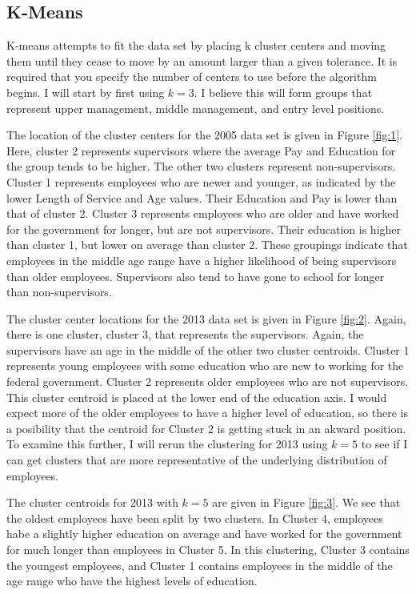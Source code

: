 \documentclass{article}
\begin{document}
    \subsection{K-Means}
    K-means attempts to fit the data set by placing k cluster centers and moving them until they cease to move by an amount larger than a given tolerance. It is required that you specify the number of centers to use before the algorithm begins. I will start by first using $k = 3$. I believe this will form groups that represent upper management, middle management, and entry level positions.
    \par
    The location of the cluster centers for the 2005 data set is given in Figure \ref{fig:1}. Here, cluster 2 represents supervisors where the average Pay and Education for the group tends to be higher. The other two clusters represent non-supervisors. Cluster 1 represents employees who are newer and younger, as indicated by the lower Length of Service and Age values. Their Education and Pay is lower than that of cluster 2. Cluster 3 represents employees who are older and have worked for the government for longer, but are not supervisors. Their education is higher than cluster 1, but lower on average than cluster 2. These groupings indicate that employees in the middle age range have a higher likelihood of being supervisors than older employees. Supervisors also tend to have gone to school for longer than non-supervisors.
    \par
    The cluster center locations for the 2013 data set is given in Figure \ref{fig:2}. Again, there is one cluster, cluster 3, that represents the supervisors. Again, the supervisors have an age in the middle of the other two cluster centroids. Cluster 1 represents young employees with some education who are new to working for the federal government. Cluster 2 represents older employees who are not supervisors. This cluster centroid is placed at the lower end of the education axis. I would expect more of the older employees to have a higher level of education, so there is a posibility that the centroid for Cluster 2 is getting stuck in an akward position. To examine this further, I will rerun the clustering for 2013 using $k = 5$ to see if I can get clusters that are more representative of the underlying distribution of employees.
    \par
    The cluster centroids for 2013 with $k = 5$ are given in Figure \ref{fig:3}. We see that the oldest employees have been split by two clusters. In Cluster 4, employees habe a slightly higher education on average and have worked for the government for much longer than employees in Cluster 5. In this clustering, Cluster 3 contains the youngest employees, and Cluster 1 contains employees in the middle of the age range who have the highest levels of education.
\end{document}
